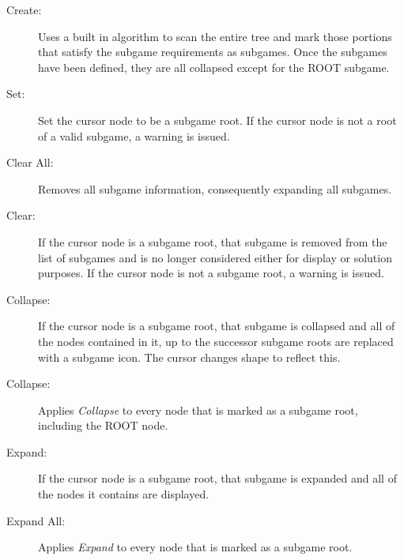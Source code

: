 \begin{description}
\item[Create:] Uses a built in algorithm to scan the entire tree and mark
those portions that satisfy the subgame requirements as subgames.  Once the
subgames have been defined, they are all collapsed except for the ROOT subgame.
\item[Set:] Set the cursor node to be a subgame root.  If the cursor node is
not a root of a valid subgame, a warning is issued.
\item[Clear All:] Removes all subgame information, consequently expanding all
subgames.
\item[Clear:] If the cursor node is a subgame root, that subgame is removed
from the list of subgames and is no longer considered either for display or
solution purposes.  If the cursor node is not a subgame root, a warning is
issued.
\item[Collapse:] If the cursor node is a subgame root, that subgame is 
collapsed and all of the nodes contained in it, up to the successor subgame
roots are replaced with a subgame icon.  The cursor changes shape to reflect
this.
\item[Collapse:] Applies {\em Collapse} to every node that is marked as a 
subgame root, including the ROOT node.
\item[Expand:] If the cursor node is a subgame root, that subgame is expanded
and all of the nodes it contains are displayed.
\item[Expand All:] Applies {\em Expand} to every node that is marked as a 
subgame root.
\end{description}


